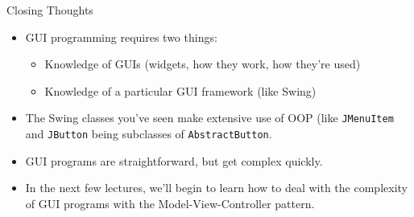 \documentclass{beamer}
\begin{document}
\begin{frame}[fragile]{Closing Thoughts}


\begin{itemize}
\item GUI programming requires two things:
\begin{itemize}
  \item Knowledge of GUIs (widgets, how they work, how they're used)
  \item Knowledge of a particular GUI framework (like Swing)
\end{itemize}
\item The Swing classes you've seen make extensive use of OOP (like {\tt JMenuItem} and {\tt JButton} being subclasses of {\tt AbstractButton}.
\item GUI programs are straightforward, but get complex quickly.
\item In the next few lectures, we'll begin to learn how to deal with the complexity of GUI programs with the Model-View-Controller pattern.
\end{itemize}


\end{frame}










\end{document}

